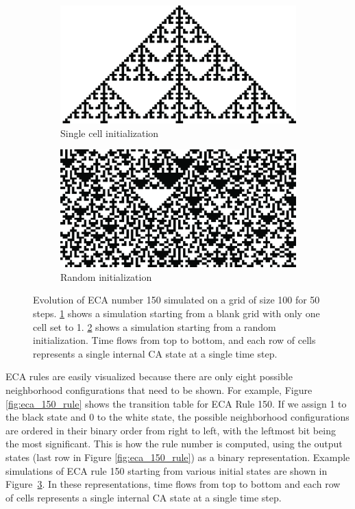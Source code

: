 \begin{figure}[htbp]
\begin{subfigure}[t]{.04\linewidth}
  \caption*{}
\end{subfigure}
\begin{subfigure}[t]{.45\linewidth}
  \centering
  \includegraphics[width=\linewidth]{figures/eca_150_single.pdf}
  \caption{Single cell initialization}
  \label{fig:eca_150_single}
\end{subfigure}
\begin{subfigure}[t]{.45\linewidth}
  \centering
  \includegraphics[width=\linewidth]{figures/eca_150_random.pdf}
  \caption{Random initialization}
  \label{fig:eca_150_random}
\end{subfigure}
\caption{Evolution of \ac{ECA} number 150 simulated on a grid of size 100 for 50
  steps. \ref{fig:eca_150_single} shows a simulation starting from a blank grid
  with only one cell set to 1. \ref{fig:eca_150_random} shows a simulation
  starting from a random initialization. Time flows from top to bottom, and each row of cells represents a single internal CA state at a single time step.}
  \label{fig:eca_150}
\end{figure}


\ac{ECA} rules are easily visualized because there are only eight possible
neighborhood configurations that need to be shown. For example, Figure
\ref{fig:eca_150_rule} shows the transition table for \ac{ECA} Rule 150. If we
assign 1 to the black state and 0 to the white state, the possible neighborhood
configurations are ordered in their binary order from right to left, with the
leftmost bit being the most significant. This is how the rule number is
computed, using the output states (last row in Figure \ref{fig:eca_150_rule}) as
a binary representation. Example simulations of \ac{ECA} rule 150 starting 
from various initial states are shown in Figure~\ref{fig:eca_150}. In these 
representations, time flows from top to bottom and each row of cells represents 
a single internal \ac{CA} state at a single time step.


